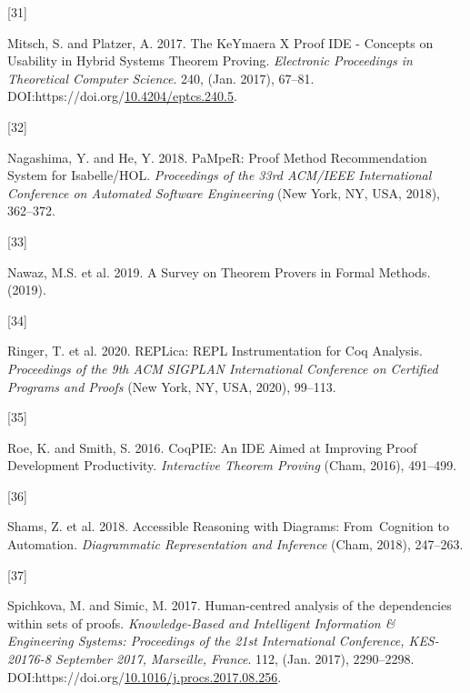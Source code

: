 \documentclass[
]{article}
\newlength{\cslhangindent}
\newlength{\csllabelwidth}
\newlength{\cslentryspacingunit} %
\newenvironment{CSLReferences}[2] %
 {%
  \setlength{\parindent}{0pt}
  \ifodd #1
  \let\oldpar\par
  \def\par{\hangindent=\cslhangindent\oldpar}
  \fi
  \setlength{\parskip}{#2\cslentryspacingunit}
 }%
 {}
\newcommand{\CSLLeftMargin}[1]{\parbox[t]{\csllabelwidth}{#1}}
\newcommand{\CSLRightInline}[1]{\parbox[t]{\linewidth - \csllabelwidth}{#1}\break}
\begin{document}
\begin{CSLReferences}{0}{0}
\leavevmode{}%
\CSLLeftMargin{{[}31{]} }
\CSLRightInline{Mitsch, S. and Platzer, A. 2017. The {KeYmaera} {X}
{Proof} {IDE} - {Concepts} on {Usability} in {Hybrid} {Systems}
{Theorem} {Proving}. \emph{Electronic Proceedings in Theoretical
Computer Science}. 240, (Jan. 2017), 67--81.
DOI:https://doi.org/\href{https://doi.org/10.4204/eptcs.240.5}{10.4204/eptcs.240.5}.}

\leavevmode{}%
\CSLLeftMargin{{[}32{]} }
\CSLRightInline{Nagashima, Y. and He, Y. 2018. {PaMpeR}: {Proof}
{Method} {Recommendation} {System} for {Isabelle}/{HOL}.
\emph{Proceedings of the 33rd {ACM}/{IEEE} {International} {Conference}
on {Automated} {Software} {Engineering}} (New York, NY, USA, 2018),
362--372.}

\leavevmode{}%
\CSLLeftMargin{{[}33{]} }
\CSLRightInline{Nawaz, M.S. et al. 2019. A {Survey} on {Theorem}
{Provers} in {Formal} {Methods}. (2019).}

\leavevmode{}%
\CSLLeftMargin{{[}34{]} }
\CSLRightInline{Ringer, T. et al. 2020. {REPLica}: {REPL}
{Instrumentation} for {Coq} {Analysis}. \emph{Proceedings of the 9th
{ACM} {SIGPLAN} {International} {Conference} on {Certified} {Programs}
and {Proofs}} (New York, NY, USA, 2020), 99--113.}

\leavevmode{}%
\CSLLeftMargin{{[}35{]} }
\CSLRightInline{Roe, K. and Smith, S. 2016. {CoqPIE}: {An} {IDE} {Aimed}
at {Improving} {Proof} {Development} {Productivity}. \emph{Interactive
{Theorem} {Proving}} (Cham, 2016), 491--499.}

\leavevmode{}%
\CSLLeftMargin{{[}36{]} }
\CSLRightInline{Shams, Z. et al. 2018. Accessible {Reasoning} with
{Diagrams}: {From}~{Cognition} to {Automation}. \emph{Diagrammatic
{Representation} and {Inference}} (Cham, 2018), 247--263.}

\leavevmode{}%
\CSLLeftMargin{{[}37{]} }
\CSLRightInline{Spichkova, M. and Simic, M. 2017. Human-centred analysis
of the dependencies within sets of proofs. \emph{Knowledge-Based and
Intelligent Information \& Engineering Systems: Proceedings of the 21st
International Conference, KES-20176-8 September 2017, Marseille,
France}. 112, (Jan. 2017), 2290--2298.
DOI:https://doi.org/\href{https://doi.org/10.1016/j.procs.2017.08.256}{10.1016/j.procs.2017.08.256}.}


\end{CSLReferences}
\end{document}
